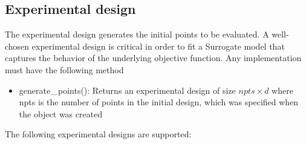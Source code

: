 \documentclass[]{article}
\begin{document}
\subsection{Experimental design} 
\label{expdes}
The experimental design generates the initial points to be evaluated. A well-chosen 
experimental design is critical in order to fit a Surrogate model that captures the behavior 
of the underlying objective function. Any implementation must have the following method
\begin{itemize}
\item generate\_\,points(): Returns an experimental design of size $npts \times d$ where
 npts is the number of points in the initial design, which was specified when the object 
 was created 
\end{itemize}
The following experimental designs are supported:
\end{document}
